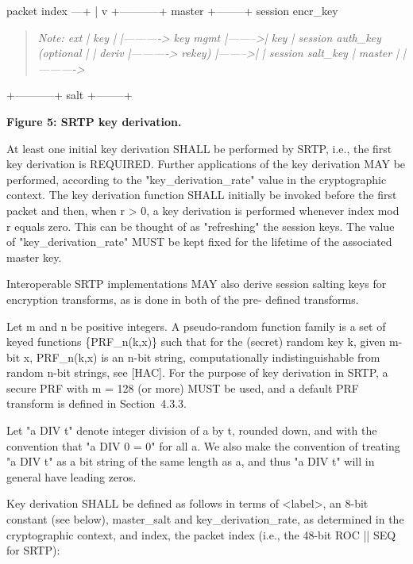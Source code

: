 \documentclass{article}
\begin{document}
packet index ---+ | v +-----------+ master  +--------+ session encr\_key

\begin{quote}
\textit{Note: ext       | key     |        |----------> key mgmt  |-------->|  key   | session auth\_key (optional |         | deriv  |----------> rekey)    |-------->|        | session salt\_key | master  |        |---------->}
\end{quote}

+-----------+ salt    +--------+

\begin{center}
\textbf{Figure 5: SRTP key derivation.}
\end{center}

At least one initial key derivation SHALL be performed by SRTP, i.e., the first key derivation is REQUIRED.  Further applications of the key derivation MAY be performed, according to the "key\_derivation\_rate" value in the cryptographic context.  The key derivation function SHALL initially be invoked before the first packet and then, when r > 0, a key derivation is performed whenever index mod r equals zero.  This can be thought of as "refreshing" the session keys.  The value of "key\_derivation\_rate" MUST be kept fixed for the lifetime of the associated master key.

Interoperable SRTP implementations MAY also derive session salting keys for encryption transforms, as is done in both of the pre- defined transforms.

Let m and n be positive integers.  A pseudo-random function family is a set of keyed functions \{PRF\_n(k,x)\} such that for the (secret) random key k, given m-bit x, PRF\_n(k,x) is an n-bit string, computationally indistinguishable from random n-bit strings, see [HAC].  For the purpose of key derivation in SRTP, a secure PRF with m = 128 (or more) MUST be used, and a default PRF transform is defined in Section~4.3.3.

Let "a DIV t" denote integer division of a by t, rounded down, and with the convention that "a DIV 0 = 0" for all a.  We also make the convention of treating "a DIV t" as a bit string of the same length as a, and thus "a DIV t" will in general have leading zeros.

Key derivation SHALL be defined as follows in terms of <label>, an 8-bit constant (see below), master\_salt and key\_derivation\_rate, as determined in the cryptographic context, and index, the packet index (i.e., the 48-bit ROC || SEQ for SRTP):
\end{document}
